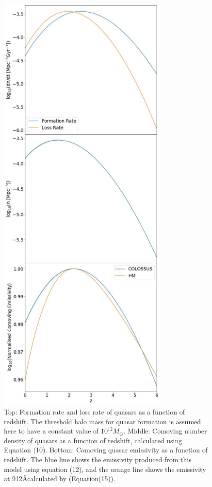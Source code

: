 \documentclass[12pt, twocolumn]{report}%
\begin{document}
\begin{figure}[H]
\centering
\includegraphics[width=8.5cm]{Plot_7.jpeg}
\caption{Top: Formation rate and loss rate of quasars as a function of redshift. The threshold halo mass for quasar formation is assumed here to have a constant value of $10^{12}M_\odot$. Middle: Comoving number density of quasars as a function of redshift, calculated using Equation (10). Bottom: Comoving quasar emissivity as a function of redshift. The blue line shows the emissivity produced from this model using equation (12), and the orange line shows the emissivity at 912\AA calculated by \cite{Haardt_Madau} (Equation(15)).}
\label{fig:7}
\end{figure}
\newpage
\twocolumngrid
\end{document}
